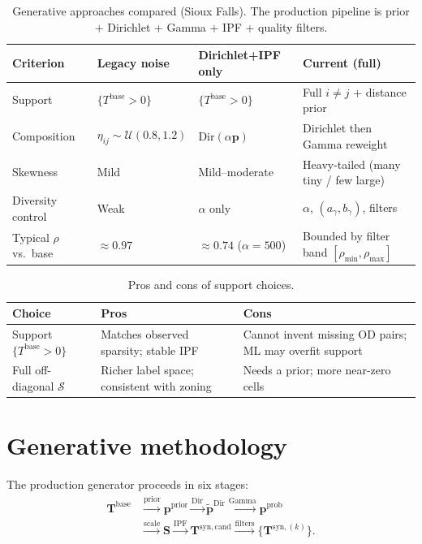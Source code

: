 \documentclass[11pt,a4paper]{report}
\newcommand{\Tbase}{\mathbf{T}^{\mathrm{base}}}
\newcommand{\Tsynk}[1]{\mathbf{T}^{\mathrm{syn},(#1)}}
\newcommand{\Tsycand}{\mathbf{T}^{\mathrm{syn,cand}}}
\newcommand{\mathbfp}{\mathbf{p}}
\newcommand{\mathbfS}{\mathbf{S}}
\begin{document}
\begin{table}[ht]
\centering
\caption{Generative approaches compared (Sioux Falls). The production pipeline is prior + Dirichlet + Gamma + IPF + quality filters.}
\label{tab:gen_compare}
\small
\begin{tabular}{@{}p{2.6cm}p{3.5cm}p{3.5cm}p{3.5cm}@{}}
\toprule
\textbf{Criterion} &
\textbf{Legacy noise} &
\textbf{Dirichlet+IPF only} &
\textbf{Current (full)} \\
\midrule
Support &
$\{T^{\mathrm{base}}>0\}$ &
$\{T^{\mathrm{base}}>0\}$ &
Full $i\neq j$ + distance prior \\
Composition &
$\eta_{ij}\sim\mathcal{U}(0.8,1.2)$ &
$\mathrm{Dir}(\alpha\mathbfp)$ &
Dirichlet then Gamma reweight \\
Skewness &
Mild &
Mild--moderate &
Heavy-tailed (many tiny / few large) \\
Diversity control &
Weak &
$\alpha$ only &
$\alpha$, $(a_\gamma,b_\gamma)$, filters \\
Typical $\rho$ vs.\ base &
$\approx 0.97$ &
$\approx 0.74$ ($\alpha=500$) &
Bounded by filter band $[\rho_{\min},\rho_{\max}]$ \\
\bottomrule
\end{tabular}
\end{table}

\begin{table}[ht]
\centering
\caption{Pros and cons of support choices.}
\label{tab:pros_support}
\small
\begin{tabular}{@{}p{3.4cm}p{5.0cm}p{5.0cm}@{}}
\toprule
\textbf{Choice} & \textbf{Pros} & \textbf{Cons} \\
\midrule
Support $\{T^{\mathrm{base}}>0\}$ &
Matches observed sparsity; stable IPF &
Cannot invent missing OD pairs; ML may overfit support \\
Full off-diagonal $\mathcal{S}$ &
Richer label space; consistent with zoning &
Needs a prior; more near-zero cells \\
\bottomrule
\end{tabular}
\end{table}


\section{Generative methodology}
\label{sec:ch1-generation}

The production generator proceeds in six stages:
\begin{equation}
\begin{aligned}
\Tbase
&\xrightarrow{\text{prior}}
\mathbfp^{\mathrm{prior}}
\xrightarrow{\mathrm{Dir}}
\tilde{\mathbfp}^{\mathrm{Dir}}
\xrightarrow{\mathrm{Gamma}}
\mathbfp^{\mathrm{prob}}
\\[-0.2em]
&\xrightarrow{\text{scale}}
\mathbfS
\xrightarrow{\mathrm{IPF}}
\Tsycand
\xrightarrow{\text{filters}}
\{\Tsynk{k}\}.
\end{aligned}
\label{eq:pipeline_stages}
\end{equation}
\end{document}
